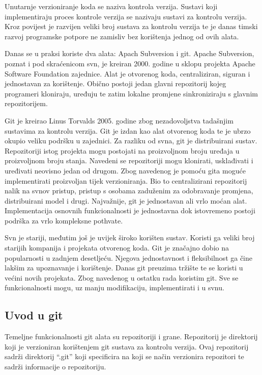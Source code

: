 \documentclass[times, utf8, diplomski, numeric]{fer}
\begin{document}
Unutarnje verzioniranje koda se naziva kontrola verzija\citep{wiki:VersionControl}. Sustavi koji implementiraju proces kontrole verzija se nazivaju sustavi za kontrolu verzija. Kroz povijest je razvijen veliki broj sustava za kontrolu verzija te je danas timski razvoj programske potpore ne zamisliv bez korištenja jednog od ovih alata.

Danas se u praksi koriste dva alata: Apach Subversion i git. Apache Subversion, poznat i pod skraćenicom svn, je kreiran 2000. godine u sklopu projekta Apache Software Foundation zajednice. Alat je otvorenog koda, centraliziran, siguran i jednostavan za korištenje. Obično postoji jedan glavni repozitorij kojeg programeri kloniraju, uređuju te zatim lokalne promjene sinkroniziraju s glavnim repozitorijem.

Git je kreirao Linus Torvalds 2005. godine zbog nezadovoljstva tadašnjim sustavima za kontrolu verzija. Git je izdan kao alat otvorenog koda te je ubrzo okupio veliku podršku u zajednici. Za razliku od svna, git je distribuirani sustav. Repozitoriji istog projekta mogu postojati na proizvoljnom broju uređaja u proizvoljnom broju stanja. Navedeni se repozitoriji mogu klonirati, usklađivati i uređivati neovisno jedan od drugom. Zbog navedenog je pomoću gita moguće implementirati proizvoljan tijek verzioniranja. Bio to centralizirani repozitorij nalik na svnov pristup, pristup s osobama zaduženim za odobravanje promjena, distribuirani model i drugi. Najvažnije, git je jednostavan ali vrlo moćan alat. Implementacija osnovnih funkcionalnosti je jednostavna dok istovremeno postoji podrška za vrlo kompleksne pothvate.

Svn je stariji, međutim još je uvijek široko korišten sustav. Koristi ga veliki broj starijih kompanija i projekata otvorenog koda. Git je značajno dobio na popularnosti u zadnjem desetljeću. Njegova jednostavnost i fleksibilnost ga čine lakšim za upoznavanje i korištenje. Danas git preuzima tržište te se koristi u većini novih projekata. Zbog navedenog u ostatku rada koristim git. Sve se funkcionalnosti mogu, uz manju modifikaciju, implementirati i u svnu.


\subsection{Uvod u git} \label{uvodUGit}

Temeljne funkcionalnosti git alata su repozitoriji i grane. Repozitorij je direktorij koji je verzioniran korištenjem git sustava za kontrolu verzija. Ovaj repozitorij sadrži direktorij “.git” koji specificira na koji se način verzionira repozitori te sadrži informacije o repozitoriju.
\end{document}
